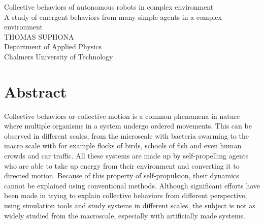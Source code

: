 Collective behaviors of autonomous robots in complex environment\\
A study of emergent behaviors from many simple agents in a complex environment\\
THOMAS SUPHONA\\
Department of Applied Physics\\
Chalmers University of Technology \setlength{\parskip}{0.5cm}

\thispagestyle{plain}			%
\setlength{\parskip}{0pt plus 1.0pt}
\section*{Abstract}
Collective behaviors or collective motion is a common phenomena 
in nature where multiple organisms in a system undergo ordered movements. 
This can be observed in different scales, from the microscale 
with bacteria swarming to the macro scale with for example flocks of birds, 
schools of fish and even human crowds and car traffic. 
All these systems are made up by self-propelling agents who are able 
to take up energy from their environment and converting it to directed motion.
Because of this property of self-propulsion, their dynamics cannot be 
explained using conventional methods. 
Although significant efforts have been made in trying to 
explain collective behaviors from different perspective, 
using simulation tools and study systems in different scales, 
the subject is not as widely studied from the 
macroscale, especially with artificially made systems.
